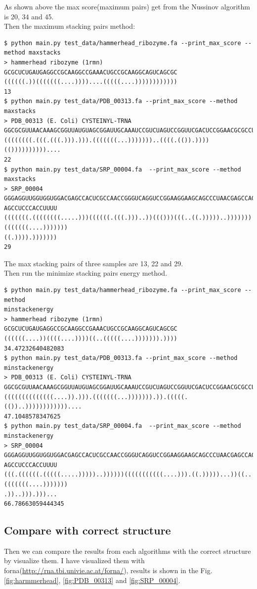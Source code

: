 \documentclass[10pt]{article}
\begin{document}
\noindent
As shown above the max score(maximum pairs) get from the Nussinov algorithm is 20, 34 and 45.\\

\noindent
Then the maximum stacking pairs method:

\begin{lstlisting}[frame=single,breaklines=false]
$ python main.py test_data/hammerhead_ribozyme.fa --print_max_score --method maxstacks
> hammerhead ribozyme (1rmn)
GCGCUCUGAUGAGGCCGCAAGGCCGAAACUGCCGCAAGGCAGUCAGCGC
((((((.))(((((((....))))....(((((....))))))))))))
13
$ python main.py test_data/PDB_00313.fa --print_max_score --method maxstacks
> PDB_00313 (E. Coli) CYSTEINYL-TRNA
GGCGCGUUAACAAAGCGGUUAUGUAGCGGAUUGCAAAUCCGUCUAGUCCGGUUCGACUCCGGAACGCGCCUCCA
((((((((.(((.(((.))).))).(((((((...)))))))..((((.(()).))))(())))))))))....
22
$ python main.py test_data/SRP_00004.fa  --print_max_score --method maxstacks
> SRP_00004
GGGAGGUUGGUGGUGGACGAGCCACUCGCCAACCGGGUCAGGUCCGGAAGGAAGCAGCCCUAACGAGCCAGGCACGGGUCGCCGUGCC
AGCCUCCCACCUUUU
(((((((.((((((((.....)))((((((.(((.)))..))((()))(((..((.)))))..)))))))(((((((....)))))))
((.)))).)))))))
29
\end{lstlisting}

\noindent
The max stacking pairs of three samples are 13, 22 and 29.\\

\noindent
Then run the minimize stacking pairs energy method.

\begin{lstlisting}[frame=single,breaklines=false]
$ python main.py test_data/hammerhead_ribozyme.fa --print_max_score --method
minstackenergy
> hammerhead ribozyme (1rmn)
GCGCUCUGAUGAGGCCGCAAGGCCGAAACUGCCGCAAGGCAGUCAGCGC
((((((....))((((....))))((..(((((....))))))).))))
34.47232640482083
$ python main.py test_data/PDB_00313.fa --print_max_score --method minstackenergy
> PDB_00313 (E. Coli) CYSTEINYL-TRNA
GGCGCGUUAACAAAGCGGUUAUGUAGCGGAUUGCAAAUCCGUCUAGUCCGGUUCGACUCCGGAACGCGCCUCCA
((((((((((((((....)).))).(((((((...))))))).)).(((((.(())..))))))))))))....
47.1048578347625
$ python main.py test_data/SRP_00004.fa  --print_max_score --method minstackenergy
> SRP_00004
GGGAGGUUGGUGGUGGACGAGCCACUCGCCAACCGGGUCAGGUCCGGAAGGAAGCAGCCCUAACGAGCCAGGCACGGGUCGCCGUGCC
AGCCUCCCACCUUUU
(((.((((((.(((((.....)))))..))))))(((((((((((....))).((.)))))...))((..(((((((....)))))))
.))..))).)))...
66.78663059444345
\end{lstlisting}

\subsection{Compare with correct structure}
\label{sec:compare}
Then we can compare the results from each algorithms with the correct structure by visualize them.
I have visualized them with forna(\url{http://rna.tbi.univie.ac.at/forna/}),
results is shown in the Fig.\ref{fig:harmmerhead}, \ref{fig:PDB_00313} and \ref{fig:SRP_00004}.
\end{document}
